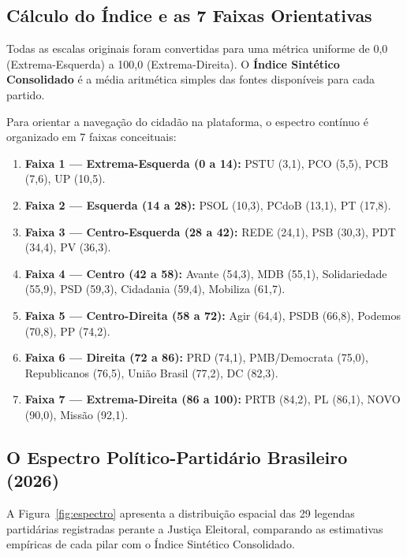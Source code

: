 \documentclass[10pt,a4paper]{article}
\begin{document}
\vspace{0.2em}

\subsection{Cálculo do Índice e as 7 Faixas Orientativas}

Todas as escalas originais foram convertidas para uma métrica uniforme de 0,0 (Extrema-Esquerda) a 100,0 (Extrema-Direita). O \textbf{Índice Sintético Consolidado} é a média aritmética simples das fontes disponíveis para cada partido.

Para orientar a navegação do cidadão na plataforma, o espectro contínuo é organizado em 7 faixas conceituais:

\begin{enumerate}\setlength{\itemsep}{0.22em}
    \item \textbf{Faixa 1 — Extrema-Esquerda (0 a 14):} PSTU (3,1), PCO (5,5), PCB (7,6), UP (10,5).
    \item \textbf{Faixa 2 — Esquerda (14 a 28):} PSOL (10,3), PCdoB (13,1), PT (17,8).
    \item \textbf{Faixa 3 — Centro-Esquerda (28 a 42):} REDE (24,1), PSB (30,3), PDT (34,4), PV (36,3).
    \item \textbf{Faixa 4 — Centro (42 a 58):} Avante (54,3), MDB (55,1), Solidariedade (55,9), PSD (59,3), Cidadania (59,4), Mobiliza (61,7).
    \item \textbf{Faixa 5 — Centro-Direita (58 a 72):} Agir (64,4), PSDB (66,8), Podemos (70,8), PP (74,2).
    \item \textbf{Faixa 6 — Direita (72 a 86):} PRD (74,1), PMB/Democrata (75,0), Republicanos (76,5), União Brasil (77,2), DC (82,3).
    \item \textbf{Faixa 7 — Extrema-Direita (86 a 100):} PRTB (84,2), PL (86,1), NOVO (90,0), Missão (92,1).
\end{enumerate}

\clearpage

\subsection{O Espectro Político-Partidário Brasileiro (2026)}

A Figura~\ref{fig:espectro} apresenta a distribuição espacial das 29 legendas partidárias registradas perante a Justiça Eleitoral, comparando as estimativas empíricas de cada pilar com o Índice Sintético Consolidado.
\end{document}
